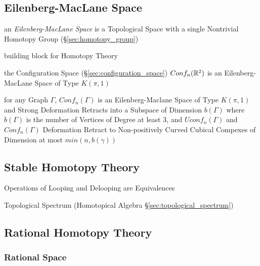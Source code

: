 \subsection{Eilenberg-MacLane Space}\label{sec:eilenberg_maclane_space}

an \emph{Eilenberg-MacLane Space} is a Topological Space with a single
Nontrivial Homotopy Group (\S\ref{sec:homotopy_group})

building block for Homotopy Theory

the Configuration Space (\S\ref{sec:configuration_space}) $Conf_n(\mathbb{R}^2)$
is an Eilenberg-MacLane Space of Type $K(\pi,1)$

for any Graph $\Gamma$, $Conf_n(\Gamma)$ is an Eilenberg-Maclane Space of Type
$K(\pi,1)$ and Strong Deformation Retracts into a Subspace of Dimension
$b(\Gamma)$ where $b(\Gamma)$ is the number of Vertices of Degree at least 3,
and $Uconf_n(\Gamma)$ and $Conf_n(\Gamma)$ Deformation Retract to
Non-positively Curved Cubical Compexes of Dimension at most $min(n,b(\gamma))$



\subsection{Stable Homotopy Theory}\label{sec:stable_homotopy}

Operations of Looping and Delooping are Equivalences

Topological Spectrum (Homotopical Algebra \S\ref{sec:topological_spectrum})



\subsection{Rational Homotopy Theory}\label{sec:rational_homotopy}

\subsubsection{Rational Space}\label{sec:rational_space}

